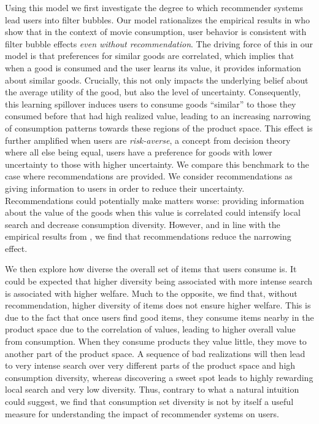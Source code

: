 \documentclass[sigconf]{acmart}
\begin{document}
Using this model we first investigate the degree to which recommender systems lead users into filter bubbles. Our model rationalizes the empirical results in \cite{nguyen2014exploring} who show that in the context of movie consumption, user behavior is consistent with filter bubble effects \textit{even without recommendation}. The driving force of this in our model is that preferences for similar goods are correlated, which implies that when a good is consumed and the user learns its value, it provides information about similar goods. Crucially, this not only impacts the underlying belief about the average utility of the good, but also the level of uncertainty. Consequently, this learning spillover induces users to consume goods ``similar'' to those they consumed before that had high realized value, leading to an increasing narrowing of consumption patterns towards these regions of the product space. This effect is further amplified when users are \textit{risk-averse}, a concept from decision theory where all else being equal, users have a preference for goods with lower uncertainty to those with higher uncertainty.
We compare this benchmark to the case where recommendations are provided. 
We consider recommendations as giving information to users in order to reduce their uncertainty.
Recommendations could potentially make matters worse: providing information about the value of the goods when this value is correlated could intensify local search and decrease consumption diversity. However, and in line with the empirical results from \cite{nguyen2014exploring}, we find that recommendations reduce the narrowing effect.
\par

We then explore how diverse the overall set of items that users consume is. It could be expected that higher diversity being associated with more intense search is associated with higher welfare. Much to the opposite, we find that, without recommendation, higher diversity of items does not ensure higher welfare.
This is due to the fact that once users find good items, they consume items nearby in the product space due to the correlation of values, leading to higher overall value from consumption. When they consume products they value little, they move to another part of the product space. A sequence of bad realizations will then lead to very intense search over very different parts of the product space and high consumption diversity, whereas discovering a sweet spot leads to highly rewarding local search and very low diversity. Thus, contrary to what a natural intuition could suggest, we find that consumption set diversity is not by itself a useful measure for understanding the impact of recommender systems on users. 
\par
\end{document}
